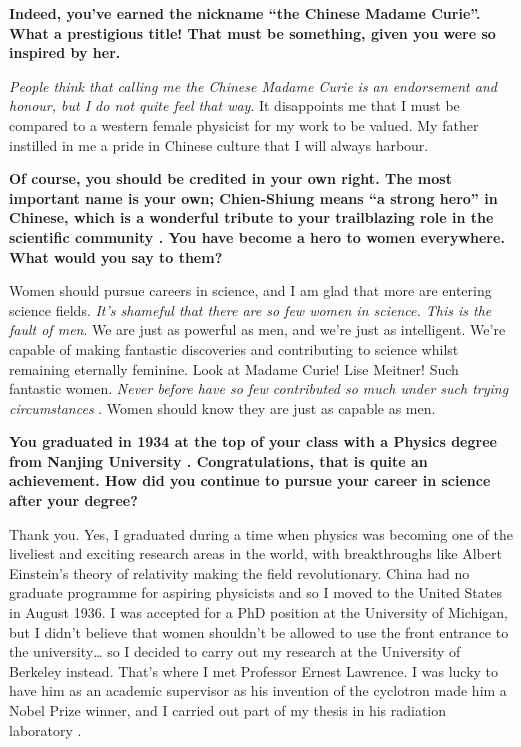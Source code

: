\documentclass{article}
\newcommand{\q}[1]{\vspace{10pt}
\textbf{#1}}
\begin{document}
\begin{multicols}{2}
\q{Indeed, you’ve earned the nickname ``the Chinese Madame Curie\cite{L1}''. What a prestigious title! That must be something, given you were so inspired by her.}


\textit{People think that calling me the Chinese Madame Curie is an endorsement and honour, but I do not quite feel that way}\cite{L5}. It disappoints me that I must be compared to a western female physicist for my work to be valued. My father instilled in me a pride in Chinese culture that I will always harbour.

\q{Of course, you should be credited in your own right. The most important name is your own; Chien-Shiung means “a strong hero” in Chinese, which is a wonderful tribute to your trailblazing role in the scientific community \cite{L6}. You have become a hero to women everywhere. What would you say to them?}

Women should pursue careers in science, and I am glad that more are entering science fields. \textit{It’s shameful that there are so few women in science. This is the fault of men}\cite{N1}. We are just as powerful as men, and we’re just as intelligent. We’re capable of making fantastic discoveries and contributing to science whilst remaining eternally feminine. Look at Madame Curie! Lise Meitner! Such fantastic women. \textit{Never before have so few contributed so much under such trying circumstances} \cite{L6}. Women should know they are just as capable as men.

\q{You graduated in 1934 at the top of your class with a Physics degree from Nanjing University \cite{L7}. Congratulations, that is quite an achievement. How did you continue to pursue your career in science after your degree?}

Thank you. Yes, I graduated during a time when physics was becoming one of the liveliest and exciting research areas in the world, with breakthroughs like Albert Einstein’s theory of relativity making the field revolutionary. China had no graduate programme for aspiring physicists and so I moved to the United States in August 1936. I was accepted for a PhD position at the University of Michigan, but I didn’t believe that women shouldn’t be allowed to use the front entrance to the university… so I decided to carry out my research at the University of Berkeley instead. That’s where I met Professor Ernest Lawrence. I was lucky to have him as an academic supervisor as his invention of the cyclotron made him a Nobel Prize winner, and I carried out part of my thesis in his radiation laboratory \cite{L5}.


\end{multicols}
\end{document}
